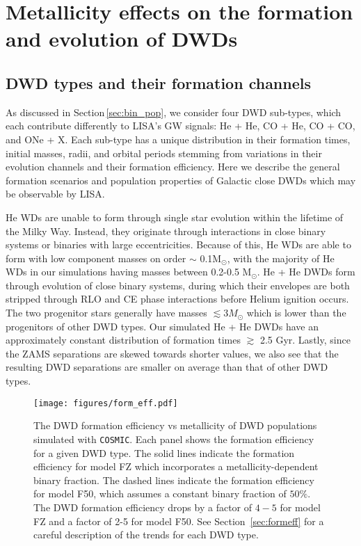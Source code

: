 \documentclass[twocolumn, linenumbers]{aastex631}
\newcommand{\cosmic}{\texttt{COSMIC}}
\begin{document}
\section{Metallicity effects on the formation and evolution of DWDs}\label{sec:results}

\subsection{DWD types and their formation channels}\label{sec:ini}
As discussed in Section\,\ref{sec:bin_pop}, we consider four DWD sub-types, which each contribute differently to LISA's GW signals: He + He, CO + He, CO + CO, and ONe + X. Each sub-type has a unique distribution in their formation times, initial masses, radii, and orbital periods stemming from variations in their evolution channels and their formation efficiency. Here we describe the general formation scenarios and population properties of Galactic close DWDs which may be observable by LISA.

He WDs are unable to form through single star evolution within the lifetime of the Milky Way. Instead, they originate through interactions in close binary systems or binaries with large eccentricities. Because of this, He WDs are able to form with low component masses on order $\sim$ 0.1M$_\odot$, with the majority of He WDs in our simulations having masses between 0.2-0.5 M$_\odot$. He + He DWDs form through evolution of close binary systems, during which their envelopes are both stripped through RLO and CE phase interactions before Helium ignition occurs. The two progenitor stars generally have masses $\lesssim 3 M_\odot$ which is lower than the progenitors of other DWD types. Our simulated He + He DWDs have an approximately constant distribution of formation times $\gtrsim$ 2.5 Gyr. Lastly, since the ZAMS separations are skewed towards shorter values, we also see that the resulting DWD separations are smaller on average than that of other DWD types. 

\begin{figure*}
	\texttt{[image: figures/form\_eff.pdf]}
    \caption{The DWD formation efficiency vs metallicity of DWD populations simulated with \cosmic. Each panel shows the formation efficiency for a given DWD type. The solid lines indicate the formation efficiency for model FZ which incorporates a metallicity-dependent binary fraction. The dashed lines indicate the formation efficiency for model F50, which assumes a constant binary fraction of $50\%$. The DWD formation efficiency drops by a factor of $4-5$ for model FZ and a factor of 2-5 for model F50. See Section~\ref{sec:formeff} for a careful description of the trends for each DWD type.}
    \label{fig:form_eff}
\end{figure*}
\end{document}
